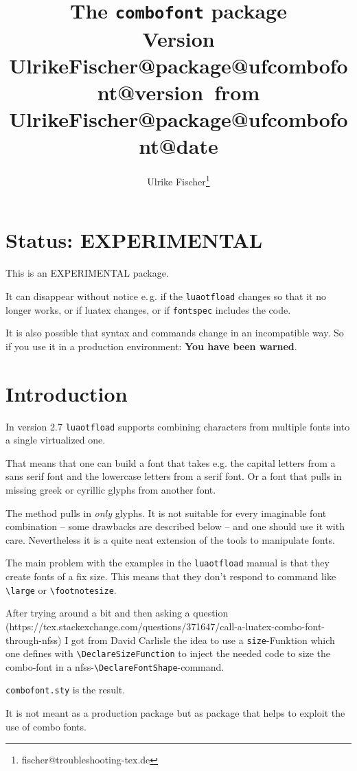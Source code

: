 \documentclass[parskip=half-,egregdoesnotlikesansseriftitles]{scrartcl}
\title{The \texttt{combofont} package \\
{\normalsize Version \csname UlrikeFischer@package@ufcombofont@version\endcsname\
from \csname UlrikeFischer@package@ufcombofont@date\endcsname}}
\author{Ulrike Fischer\thanks{fischer@troubleshooting-tex.de}}
\newcommand\package[1]{\texttt{#1}}
\begin{document}
\maketitle

\section{Status: EXPERIMENTAL}

This is an EXPERIMENTAL package.

It can disappear without notice e.\,g. if the \package{luaotfload} changes so that it no longer works, or if luatex changes, or if \package{fontspec} includes the code.

It is also possible that syntax and commands change in an incompatible way. So if you use it in a production environment: \textbf{You have been warned}.

\section{Introduction}
In version 2.7 \package{luaotfload} supports combining characters from multiple fonts into a single virtualized one.

That means that one can build a font that takes e.g. the capital letters from a sans serif font and the lowercase letters from a serif font. Or a font that pulls in missing greek or cyrillic glyphs from another font.

The method pulls in \emph{only} glyphs. It is not suitable for every imaginable font combination -- some drawbacks are described below -- and one should use it with care. Nevertheless it is a quite neat extension of the tools to manipulate fonts.

The main problem with the examples in the \package{luaotfload} manual is that they create fonts of a fix size. This means that they don't respond to command like \verb+\large+ or \verb+\footnotesize+.

After trying around a bit and then asking a question (https://tex.stackexchange.com/questions/371647/call-a-luatex-combo-font-through-nfss) I got from David Carlisle the idea to use a \texttt{size}-Funktion which one defines with \verb+\DeclareSizeFunction+ to inject the needed code to size the combo-font in a nfss-\verb+\DeclareFontShape+-command.

\package{combofont.sty} is the result.

It is not meant as a production package but as package that helps to exploit the use of combo fonts.
\end{document}

